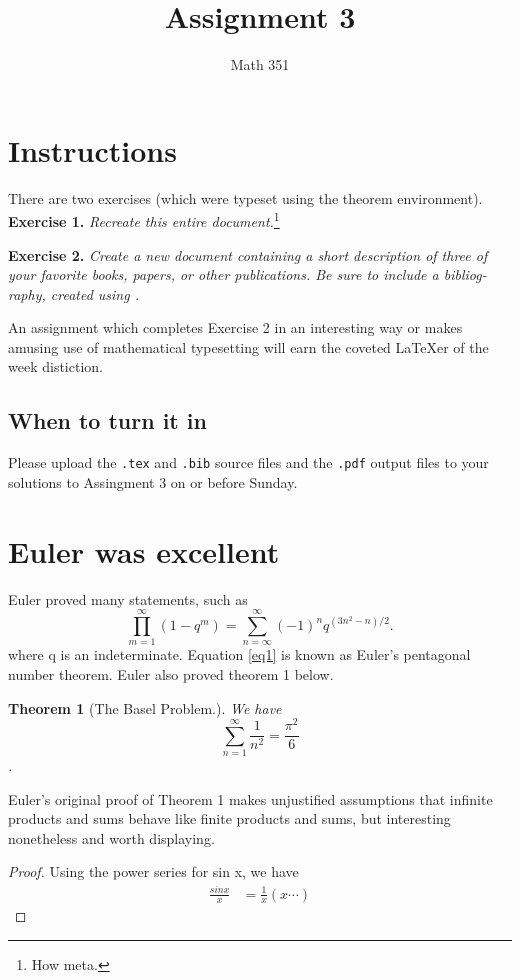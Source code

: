 \documentclass{article}
\title{Assignment 3}
\author{Math 351}
\date{}
\newtheorem{theorem}{Theorem}
\begin{document}
\maketitle

\tableofcontents
\section{Instructions}

There are two exercises (which were typeset using the theorem environment).
\noindent\textbf{Exercise 1.} \emph{Recreate this entire document.}\footnote{How meta.}

\noindent\textbf{Exercise 2.} \emph{Create a new document containing a short description
of three of your favorite books, papers, or other publications. Be sure to include
a bibliog-raphy, created using .}

An assignment which completes Exercise 2 in an interesting way or makes amusing
use of mathematical typesetting will earn the coveted \LaTeX er of the week distiction.

\subsection[Due Date]{When to turn it in}

Please upload the \verb~.tex~ and \verb~.bib~ source files and the \verb~.pdf~ output files
to your solutions to Assingment 3 on or before Sunday.

\section{Euler was excellent}

Euler proved many statements, such as
\begin{equation}
    \prod_{m=1}^{\infty} \left(1-q^m\right) = \sum_{n=\infty}^{\infty} \left(-1\right)^n q^{\left(3n^2-n\right)/2}. \label{eq1}
\end{equation}
where q is an indeterminate. Equation \eqref{eq1} is known as Euler's pentagonal number
theorem. Euler also proved theorem 1 below.

\begin{theorem}[The Basel Problem.]
\label{E}
\emph{We have} \[\sum_{n=1}^{\infty} \frac{1}{n^2} = \frac{\pi^2}{6}\].
\end{theorem}

Euler's original proof of Theorem 1 makes unjustified assumptions that infinite products and sums behave like finite products and sums, but interesting nonetheless and worth displaying.

\begin{proof}
Using the power series for sin x, we have
\begin{align*}
\frac{sin x}{x} & = \frac{1}{x} \left( x \cdots \right)
\end{align*}
\end{proof}
\end{document}
